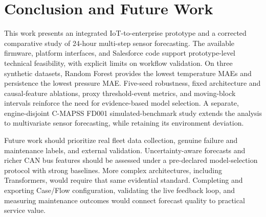 \documentclass[conference]{IEEEtran}
\begin{document}
\section{Conclusion and Future Work}
This work presents an integrated IoT-to-enterprise prototype and a corrected
comparative study of 24-hour multi-step sensor forecasting. The available
firmware, platform interfaces, and Salesforce code support prototype-level
technical feasibility, with explicit limits on workflow validation. On three
synthetic datasets, Random Forest provides the lowest temperature MAEs and
persistence the lowest pressure MAE. Five-seed robustness, fixed architecture
and causal-feature ablations, proxy threshold-event metrics, and moving-block
intervals reinforce the need for evidence-based model selection. A separate,
engine-disjoint C-MAPSS FD001 simulated-benchmark study extends the analysis to
multivariate sensor forecasting, while retaining its environment deviation.

Future work should prioritize real fleet data collection, genuine failure and maintenance labels, and external validation. Uncertainty-aware forecasts and richer CAN bus features should be assessed under a pre-declared model-selection protocol with strong baselines. More complex architectures, including Transformers, would require that same evidential standard. Completing and exporting Case/Flow configuration, validating the live feedback loop, and measuring maintenance outcomes would connect forecast quality to practical service value.



\end{document}
